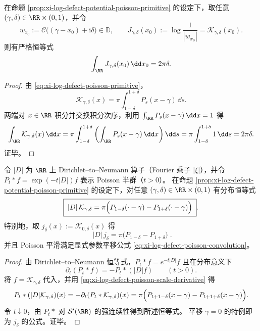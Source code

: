 

\begin{theorem}\label{thm:xi-comoving-jensen-weight-integral-conservation}
在命题 \ref{prop:xi-log-defect-potential-poisson-primitive} 的设定下，取任意 \((\gamma,\delta)\in\RR\times(0,1)\)，并令
\[
w_{x_0}:=\mathcal{C}\bigl((\gamma-x_0)+\mathrm{i}\delta\bigr)\in\mathbb{D},
\qquad
J_{\gamma,\delta}(x_0):=\log\frac{1}{|w_{x_0}|}=\mathcal{K}_{\gamma,\delta}(x_0).
\]
则有严格恒等式
\[
\int_{\RR}J_{\gamma,\delta}(x_0)\,\dd x_0=2\pi\delta.
\]
\end{theorem}
\begin{proof}
由 \eqref{eq:xi-log-defect-poisson-primitive}，
\[
\mathcal{K}_{\gamma,\delta}(x)=\pi\int_{1-\delta}^{1+\delta}P_s(x-\gamma)\,\dd s.
\]
两端对 \(x\in\RR\) 积分并交换积分次序，利用 \(\int_{\RR}P_s(x-\gamma)\,\dd x=1\) 得
\[
\int_{\RR}\mathcal{K}_{\gamma,\delta}(x)\,\dd x
=\pi\int_{1-\delta}^{1+\delta}\left(\int_{\RR}P_s(x-\gamma)\,\dd x\right)\dd s
=\pi\int_{1-\delta}^{1+\delta}1\,\dd s
=2\pi\delta.
\]
证毕。
\end{proof}

\begin{proposition}\label{prop:xi-dtn-acts-on-jensen-kernel}
令 \(|D|\) 为 \(\RR\) 上 Dirichlet--to--Neumann 算子（Fourier 乘子 \(|\xi|\)），并令 \(P_t*f=\exp(-t|D|)f\) 表示 Poisson 半群（\(t>0\)）。
在命题 \ref{prop:xi-log-defect-potential-poisson-primitive} 的设定下，对任意 \((\gamma,\delta)\in\RR\times(0,1)\) 有分布恒等式
\[
\boxed{\;
|D|\,\mathcal{K}_{\gamma,\delta}
=\pi\Bigl(P_{1-\delta}(\cdot-\gamma)-P_{1+\delta}(\cdot-\gamma)\Bigr)\; }.
\]
特别地，取 \(j_\delta(x):=\mathcal{K}_{0,\delta}(x)\) 得
\[
\boxed{\;
|D|\,j_\delta
=\pi\bigl(P_{1-\delta}-P_{1+\delta}\bigr)\; }.
\]
并且 Poisson 平滑满足显式参数平移公式 \eqref{eq:xi-log-defect-poisson-convolution}。
\end{proposition}
\begin{proof}
由 Dirichlet--to--Neumann 恒等式，\(P_t*f=e^{-t|D|}f\) 且在分布意义下
\[
\partial_t(P_t*f)=-P_t*(|D|f)\qquad(t>0).
\]
将 \(f=\mathcal{K}_{\gamma,\delta}\) 代入，并用 \eqref{eq:xi-log-defect-poisson-scale-derivative} 得
\[
P_t*(|D|\mathcal{K}_{\gamma,\delta})(x)
=-\partial_t(P_t*\mathcal{K}_{\gamma,\delta})(x)
=\pi\Bigl(P_{t+1-\delta}(x-\gamma)-P_{t+1+\delta}(x-\gamma)\Bigr).
\]
令 \(t\downarrow 0\)，由 \(P_t*\) 对 \(\mathcal{S}'(\RR)\) 的强连续性得到所述恒等式。
平移 \(\gamma=0\) 的特例即为 \(j_\delta\) 的公式。证毕。
\end{proof}

